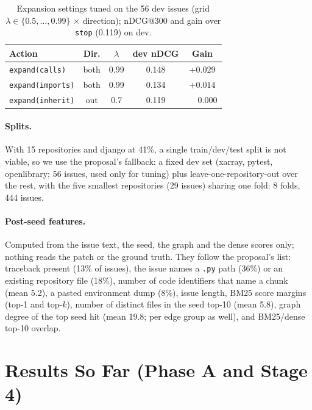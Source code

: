 \documentclass[11pt]{article}
\newcommand{\action}[1]{\texttt{#1}}
\begin{document}
\begin{table}[t]
\centering
\small
\setlength{\tabcolsep}{4pt}
\begin{tabular}{@{}lcccc@{}}
\toprule
Action & Dir. & $\lambda$ & dev nDCG & Gain \\
\midrule
\action{expand(calls)}   & both & 0.99 & 0.148 & $+0.029$ \\
\action{expand(imports)} & both & 0.99 & 0.134 & $+0.014$ \\
\action{expand(inherit)} & out  & 0.7  & 0.119 & $\phantom{+}0.000$ \\
\bottomrule
\end{tabular}
\caption{Expansion settings tuned on the 56 dev issues (grid
$\lambda \in \{0.5,\dots,0.99\}$ $\times$ direction); nDCG@300 and gain over
\action{stop} (0.119) on dev.}
\label{tab:tuning}
\end{table}

\paragraph{Splits.} With 15 repositories and django at 41\%, a single
train/dev/test split is not viable, so we use the proposal's fallback: a fixed
dev set (xarray, pytest, openlibrary; 56 issues, used only for tuning) plus
leave-one-repository-out over the rest, with the five smallest repositories
(29 issues) sharing one fold: 8 folds, 444 issues.

\paragraph{Post-seed features.} Computed from the issue text, the seed, the
graph and the dense scores only; nothing reads the patch or the ground truth.
They follow the proposal's list: traceback present (13\% of issues), the issue
names a \texttt{.py} path (36\%) or an existing repository file (18\%), number
of code identifiers that name a chunk (mean 5.2), a pasted environment dump
(8\%), issue length, BM25 score margins (top-1 and top-$k$), number of
distinct files in the seed top-10 (mean 5.8), graph degree of the top seed hit
(mean 19.8; per edge group as well), and BM25/dense top-10 overlap.

\section{Results So Far (Phase A and Stage 4)}
\label{sec:results}
\end{document}
